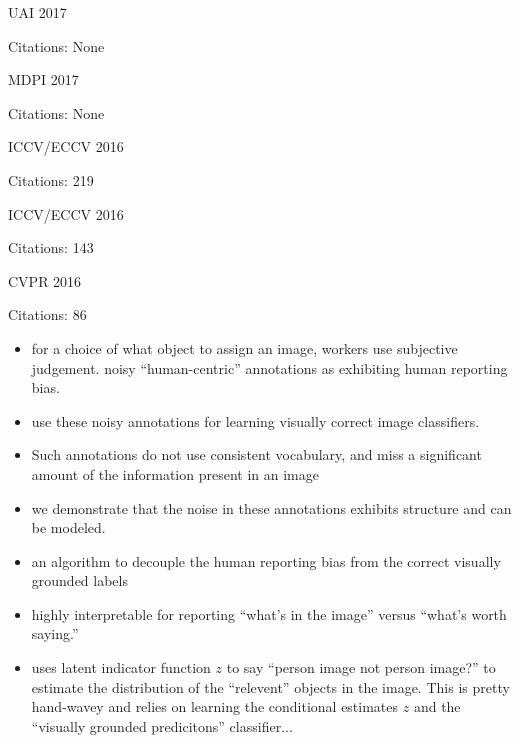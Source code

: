 \documentclass[11pt]{article}
\begin{document}
\vspace{2cm}

\noindent UAI 2017

\noindent Citations: None

\vspace{2cm}

\noindent MDPI 2017

\noindent Citations: None

\vspace{2cm}

\noindent ICCV/ECCV 2016

\noindent Citations: 219

\vspace{2cm}

\noindent ICCV/ECCV 2016

\noindent Citations: 143

\vspace{2cm}

\noindent CVPR 2016

\noindent Citations: 86

\begin{itemize}
\item for a choice of what object to assign an image, workers use subjective judgement. noisy “human-centric” annotations as exhibiting human reporting bias.
\item use these noisy annotations for learning visually correct image classifiers.
\item  Such annotations do not use consistent vocabulary, and miss a significant amount of the information present in an image
\item we demonstrate that the noise in these annotations exhibits structure and can be modeled.
\item an algorithm to decouple the human reporting bias from the correct visually grounded labels
\item highly interpretable for reporting “what’s in the image” versus “what’s worth saying.”
\item uses latent indicator function $z$ to say ``person image not person image?'' to estimate the distribution of the ``relevent'' objects in the image. This is pretty hand-wavey and relies on learning the conditional estimates $z$ and the ``visually grounded predicitons'' classifier...
\end{itemize}
\end{document}
